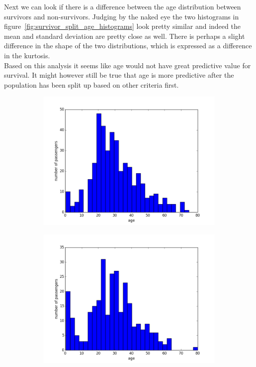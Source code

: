 \documentclass[english, a4paper]{article}
\begin{document}
Next we can look if there is a difference between the age distribution between survivors and non-survivors. Judging by the naked eye the two histograms in figure~\ref{fig:survivor_split_age_histograms} look pretty similar and indeed the mean and standard deviation are pretty close as well. There is perhaps a slight difference in the shape of the two distributions, which is expressed as a difference in the kurtosis.\\
Based on this analysis it seems like age would not have great predictive value for survival. It might however still be true that age is more predictive after the population has been split up based on other criteria first.
\begin{figure}[H]
    \begin{subfigure}{.5\textwidth}
        \includegraphics[width=\linewidth]{non_survivor_age_distribution}
    \end{subfigure}
    \begin{subfigure}{.5\textwidth}
        \includegraphics[width=\linewidth]{survivor_age_distribution}

\end{subfigure}
\end{figure}
\end{document}

